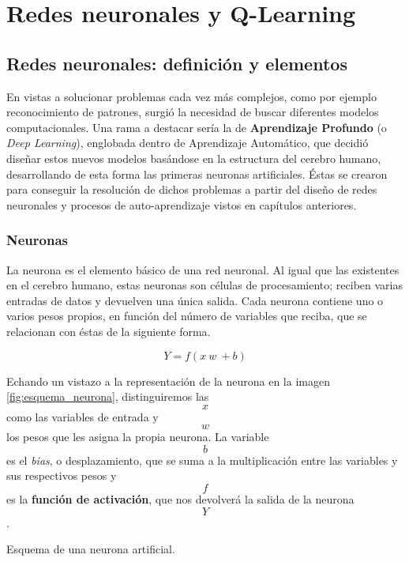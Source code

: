 \chapter{Redes neuronales y Q-Learning}
\label{cap:deepLearning}


\section{Redes neuronales: definición y elementos}
En vistas a solucionar problemas cada vez más complejos, como por ejemplo reconocimiento de patrones, surgió la necesidad de buscar diferentes modelos computacionales. Una rama a destacar sería la de \textbf{Aprendizaje Profundo} (o \textit{Deep Learning}), englobada dentro de Aprendizaje Automático, que decidió diseñar estos nuevos modelos basándose en la estructura del cerebro humano, desarrollando de esta forma las primeras neuronas artificiales. Éstas se crearon para conseguir la resolución de dichos problemas a partir del diseño de redes neuronales y procesos de auto-aprendizaje vistos en capítulos anteriores.

\subsection{Neuronas}
La neurona es el elemento básico de una red neuronal. Al igual que las existentes en el cerebro humano, estas neuronas son células de procesamiento; reciben varias entradas de datos y devuelven una única salida. Cada neurona contiene uno o varios pesos propios, en función del número de variables que reciba, que se relacionan con éstas de la siguiente forma.

$$Y = f(x\ w\ + b)$$

Echando un vistazo a la representación de la neurona en la imagen \ref{fig:esquema_neurona}, distinguiremos las $$x$$ como las variables de entrada y $$w$$ los pesos que les asigna la propia neurona. La variable $$b$$ es el \textit{bias}, o desplazamiento, que se suma a la multiplicación entre las variables y sus respectivos pesos y $$f$$ es la \textbf{función de activación}, que nos devolverá la salida de la neurona $$Y$$.

%
       {Esquema de una neurona artificial.}

